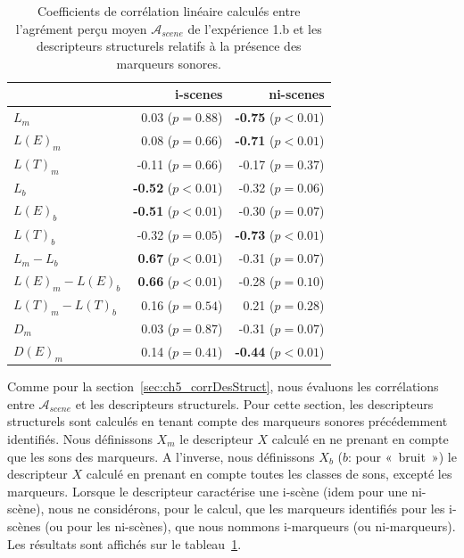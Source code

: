\begin{table}[t]
\centering
\begin{tabular}{l r r} 
                  &   i-scenes                  & ni-scenes \\
\hline
$L_m$              & 0.03  ($p=0.88$)           & \textbf{-0.75} ($p<0.01$) \\
$L(E)_m$           & 0.08  ($p=0.66$)           & \textbf{-0.71} ($p<0.01$) \\
$L(T)_m$           & -0.11 ($p=0.66$)           & -0.17 ($p=0.37$) \\
$L_b$              & \textbf{-0.52} ($p<0.01$)  & -0.32 ($p=0.06$) \\
$L(E)_b$           & \textbf{-0.51} ($p<0.01$)  & -0.30 ($p=0.07$) \\
$L(T)_b$           & -0.32 ($p=0.05$)           & \textbf{-0.73} ($p<0.01$) \\
$L_m-L_b$          & \textbf{0.67} ($p<0.01$)   & -0.31 ($p=0.07$) \\
$L(E)_m-L(E)_b$    & \textbf{0.66} ($p<0.01$)   & -0.28 ($p=0.10$) \\
$L(T)_m-L(T)_b$    & 0.16 ($p=0.54$)            & 0.21 ($p=0.28$) \\
$D_m$              & 0.03 ($p=0.87$)            & -0.31 ($p=0.07$) \\
$D(E)_m$           & 0.14 ($p=0.41$)            & \textbf{-0.44} ($p<0.01$) \\
\hline
\end{tabular}
\vspace{0.5mm}
\caption{Coefficients de corrélation linéaire calculés entre l'agrément perçu moyen $\mathcal{A}_{scene}$ de l'expérience 1.b et les descripteurs structurels relatifs à la présence des marqueurs sonores.}
\label{tab:corrMarkers}
\end{table}

Comme pour la section~\ref{sec:ch5_corrDesStruct}, nous évaluons les corrélations entre $\mathcal{A}_{scene}$ et les descripteurs structurels. Pour cette section, les descripteurs structurels sont calculés en tenant compte des marqueurs sonores précédemment identifiés. Nous définissons $X_m$ le descripteur $X$ calculé en ne prenant en compte que les sons des marqueurs. A l'inverse, nous définissons $X_b$ ($b$: pour «~bruit~») le descripteur $X$ calculé en prenant en compte toutes les classes de sons, excepté les marqueurs. Lorsque le descripteur caractérise une i-scène (idem pour une ni-scène), nous ne considérons, pour le calcul, que les marqueurs identifiés pour les i-scènes (ou pour les ni-scènes), que nous nommons i-marqueurs (ou ni-marqueurs). Les résultats sont affichés sur le tableau~\ref{tab:corrMarkers}.


